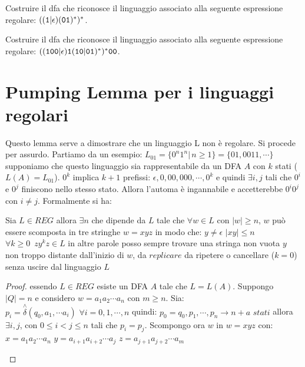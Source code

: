 \begin{Exercise}\label{exe:er-dfa-4}
Costruire il dfa che riconosce il linguaggio associato alla seguente espressione regolare: $((\mathtt{1}|\epsilon)(\mathtt{0}\mathtt{1}){}^{\ast}){}^{\ast}$.
\end{Exercise}

\begin{Exercise}\label{exe:er-dfa-5}
Costruire il dfa che riconosce il linguaggio associato alla seguente espressione regolare: $((\mathtt{1}\mathtt{0}\mathtt{0}|\epsilon)\mathtt{1}(\mathtt{1}\mathtt{0}|\mathtt{0}\mathtt{1}){}^{\ast}){}^{\ast}\mathtt{0}\mathtt{0}$.
\end{Exercise}

\section{Pumping Lemma per i linguaggi regolari}
Questo lemma serve a dimostrare che un linguaggio L non è regolare. Si procede per assurdo.
Partiamo da un esempio:
$L_{01}=\{0^n1^n|\,n\geq 1\}=\{01,0011,\cdots\}$
supponiamo che questo linguaggio sia rappresentabile da un DFA $A$ con $k$ stati ($L(A)=L_{01}$).
$0^k$ implica $k+1$ prefissi: $\epsilon,0,00,000,\cdots,0^k$ e quindi $\exists i,j$ tali che $0^i$ e $0^j$ finiscono nello stesso stato. Allora l'automa è ingannabile e accetterebbe $0^i0^j$ con $i\neq j$.
Formalmente si ha:
\begin{theorem}
Sia $L\in REG$ allora $\exists n$ che dipende da $L$ tale che $\forall w\in L$ con $|w|\geq n$, $w$ può essere scomposta in tre stringhe $w=xyz$ in modo che:
$y\neq \epsilon$
$|xy|\leq n$
$\forall k\geq 0\,\,\, zy^kz\in L$
in altre parole posso sempre trovare una stringa non vuota $y$ non troppo distante dall'inizio di $w$, da $replicare$ da ripetere o cancellare ($k=0$) senza uscire dal linguaggio $L$
\end{theorem}
\begin{proof}
essendo $L\in REG$ esiste un DFA $A$ tale che $L=L(A)$. Suppongo $|Q|=n$ e considero $w=a_1a_2\cdots a_n$ con $m\geq n$. Sia:
$p_i=\stackrel{\wedge}{\delta}(q_0,a_1,\cdots a_i)\,\,\forall i=0,1,\cdots,n$
quindi:
$p_0=q_0,p_1,\cdots,p_n\to n+a\,\,stati$
allora $\exists i,j$, con $0\leq i<j\leq n$ tali che $p_i=p_j$. Scompongo ora $w$ in $w=xyz$ con:
$x=a_1a_2\cdots a_n$
$y=a_{i+1}a_{i+2}\cdots a_j$
$z=a_{j+1}a_{j+2}\cdots a_m$
\begin{center}
\end{center}
\end{proof}
